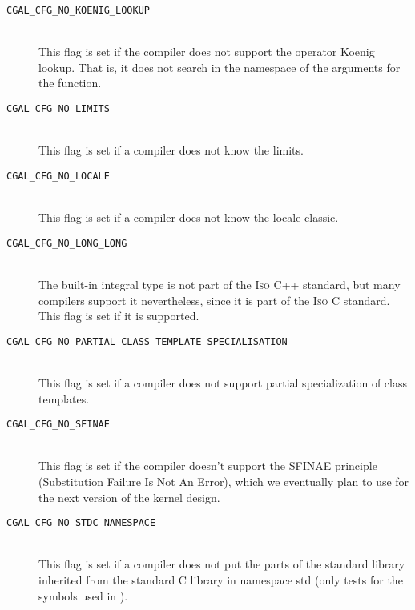\begin{description}
\item[{\tt CGAL\_CFG\_NO\_KOENIG\_LOOKUP}]~\\
  This flag is set if the compiler does not support the operator
  Koenig lookup. That is, it does not search in the namespace of the
  arguments for the function.
 
\item[{\tt CGAL\_CFG\_NO\_LIMITS}]~\\
  This flag is set if a compiler does not know the limits.

\item[{\tt CGAL\_CFG\_NO\_LOCALE}]~\\
  This flag is set if a compiler does not know the locale classic. 

\item[{\tt CGAL\_CFG\_NO\_LONG\_LONG}]~\\
  The  built-in integral type is not part of the
  \textsc{Iso} C++ standard, but many compilers support it
  nevertheless, since it is part of the \textsc{Iso} C standard. This
  flag is set if it is supported.
  
\item[{\tt CGAL\_CFG\_NO\_PARTIAL\_CLASS\_TEMPLATE\_SPECIALISATION}]~\\
  This flag is set if a compiler does not support partial
  specialization of class templates.

\item[{\tt CGAL\_CFG\_NO\_SFINAE}]~\\ 
  This flag is set if the compiler doesn't support the SFINAE
  principle (Substitution Failure Is Not An Error), which we
  eventually plan to use for the next version of the kernel design.
 
\item[{\tt CGAL\_CFG\_NO\_STDC\_NAMESPACE}]~\\ 
  This flag is set if a compiler does not put the parts of the
  standard library inherited from the standard C library in namespace
  {\ccFont std} (only tests for the symbols used in \cgal).
 

\end{description}
